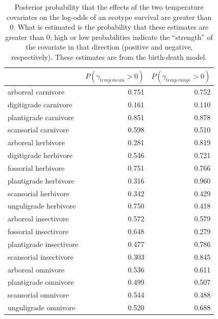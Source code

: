 \begin{table}[ht]
  \centering
  \caption[Posterior probablity of effects of temperature on survival]{Posterior probability that the effects of the two temperature covariates on the log-odds of an ecotype survival are greater than 0. What is estimated is the probability that these estimates are greater than 0; high or low probabilities indicate the ``strength'' of the covariate in that direction (positive and negative, respectively). These estimates are from the birth-death model.}
  \label{tab:surv_temp}
  \begin{tabular}{ l r r }
    \hline
    & \(P(\gamma_{temp\ mean} > 0)\) & \(P(\gamma_{temp\ range} > 0)\) \\ 
    \hline
    arboreal carnivore & 0.751 & 0.752 \\ 
    digitigrade carnivore & 0.161 & 0.110 \\ 
    plantigrade carnivore & 0.851 & 0.878 \\ 
    scansorial carnivore & 0.598 & 0.510 \\ 
    arboreal herbivore & 0.281 & 0.819 \\ 
    digitigrade herbivore & 0.546 & 0.721 \\ 
    fossorial herbivore & 0.751 & 0.766 \\ 
    plantigrade herbivore & 0.316 & 0.960 \\ 
    scansorial herbivore & 0.342 & 0.429 \\ 
    unguligrade herbivore & 0.750 & 0.418 \\ 
    arboreal insectivore & 0.572 & 0.579 \\ 
    fossorial insectivore & 0.648 & 0.279 \\ 
    plantigrade insectivore & 0.477 & 0.786 \\ 
    scansorial insectivore & 0.303 & 0.845 \\ 
    arboreal omnivore & 0.536 & 0.611 \\ 
    plantigrade omnivore & 0.499 & 0.507 \\ 
    scansorial omnivore & 0.544 & 0.488 \\ 
    unguligrade omnivore & 0.520 & 0.688 \\ 
    \hline
  \end{tabular}
\end{table}





